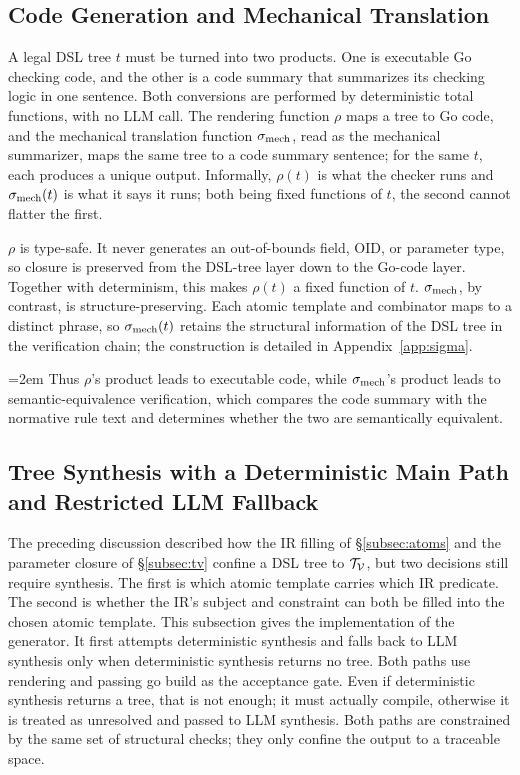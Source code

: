 \subsection{Code Generation and Mechanical Translation}
\label{subsec:mech}

A legal DSL tree $t$ must be turned into two products. One is executable Go
checking code, and the other is a code summary that
summarizes its checking logic in one sentence. Both conversions are performed by
deterministic total functions, with no LLM call. The rendering function $\rho$
maps a tree to Go code, and the mechanical translation function $\sigma_{\mathrm{mech}}$, read as
the mechanical summarizer, maps the
same tree to a code summary sentence; for the same $t$, each produces a unique
output. Informally, $\rho(t)$ is what the checker runs and $\sigma_{\mathrm{mech}}(t)$ is what it
says it runs; both being fixed functions of $t$, the second cannot flatter the
first.

$\rho$ is type-safe. It never generates an out-of-bounds field, OID, or
parameter type, so closure is preserved from the DSL-tree layer down to the
Go-code layer. Together with determinism, this makes $\rho(t)$ a fixed function
of $t$.
$\sigma_{\mathrm{mech}}$, by contrast, is structure-preserving. Each atomic template and
combinator maps to a distinct phrase, so $\sigma_{\mathrm{mech}}(t)$ retains the structural
information of the DSL tree in the verification chain; the construction is
detailed in Appendix~\ref{app:sigma}.

\begingroup\emergencystretch=2em\relax
Thus $\rho$'s product leads to executable code, while $\sigma_{\mathrm{mech}}$'s product leads to
semantic-equivalence verification, which compares the code summary with the
normative rule text and determines whether the two are semantically equivalent.
\par\endgroup


\subsection{Tree Synthesis with a Deterministic Main Path and Restricted LLM
Fallback}
\label{subsec:synth}

The preceding discussion described how the IR filling of \S\ref{subsec:atoms} and the
parameter closure of \S\ref{subsec:tv} confine a DSL tree to $\mathcal{T}_{\mathcal{V}}$, but two
decisions still require synthesis. The first is which atomic template carries
which IR predicate. The second is whether the IR's subject and
constraint can both be filled into the chosen atomic template.
This subsection gives the implementation of the generator. It
first attempts deterministic synthesis and falls back to LLM synthesis only when
deterministic synthesis returns no tree. Both paths use rendering and passing go build as
the acceptance gate. Even if deterministic synthesis returns a tree, that is
not enough; it must actually compile, otherwise it is treated as unresolved and
passed to LLM synthesis. Both paths are constrained by the same set of
structural checks; they only confine the output to a traceable space.

